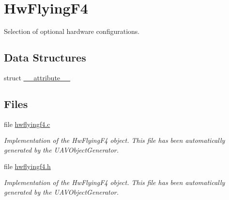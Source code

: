 \hypertarget{group___hw_flying_f4}{\section{\-Hw\-Flying\-F4}
\label{group___hw_flying_f4}
}


\-Selection of optional hardware configurations.  


\subsection*{\-Data \-Structures}
\begin{DoxyCompactItemize}
\item 
struct \hyperlink{struct____attribute____}{\-\_\-\-\_\-attribute\-\_\-\-\_\-}
\end{DoxyCompactItemize}
\subsection*{\-Files}
\begin{DoxyCompactItemize}
\item 
file \hyperlink{hwflyingf4_8c}{hwflyingf4.\-c}
\begin{DoxyCompactList}\small\item\em \-Implementation of the \-Hw\-Flying\-F4 object. \-This file has been automatically generated by the \-U\-A\-V\-Object\-Generator. \end{DoxyCompactList}\item 
file \hyperlink{hwflyingf4_8h}{hwflyingf4.\-h}
\begin{DoxyCompactList}\small\item\em \-Implementation of the \-Hw\-Flying\-F4 object. \-This file has been automatically generated by the \-U\-A\-V\-Object\-Generator. \end{DoxyCompactList}\end{DoxyCompactItemize}
